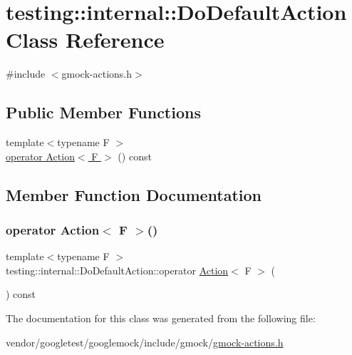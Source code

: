 \hypertarget{classtesting_1_1internal_1_1_do_default_action}{}\section{testing\+:\+:internal\+:\+:Do\+Default\+Action Class Reference}
\label{classtesting_1_1internal_1_1_do_default_action}


{\ttfamily \#include $<$gmock-\/actions.\+h$>$}

\subsection*{Public Member Functions}
\begin{DoxyCompactItemize}
\item 
{\footnotesize template$<$typename F $>$ }\\\hyperlink{classtesting_1_1internal_1_1_do_default_action_aea08828a0d64847e29ab7a5abeb74149}{operator Action$<$ F $>$} () const
\end{DoxyCompactItemize}


\subsection{Member Function Documentation}
\mbox{\label{classtesting_1_1internal_1_1_do_default_action_aea08828a0d64847e29ab7a5abeb74149}} 
\subsubsection{\texorpdfstring{operator Action$<$ F $>$()}{operator Action< F >()}}
{\footnotesize\ttfamily template$<$typename F $>$ \\
testing\+::internal\+::\+Do\+Default\+Action\+::operator \hyperlink{classtesting_1_1_action}{Action}$<$ F $>$ (\begin{DoxyParamCaption}{ }\end{DoxyParamCaption}) const\hspace{0.3cm}{\ttfamily [inline]}}



The documentation for this class was generated from the following file\+:\begin{DoxyCompactItemize}
\item 
vendor/googletest/googlemock/include/gmock/\hyperlink{gmock-actions_8h}{gmock-\/actions.\+h}\end{DoxyCompactItemize}
